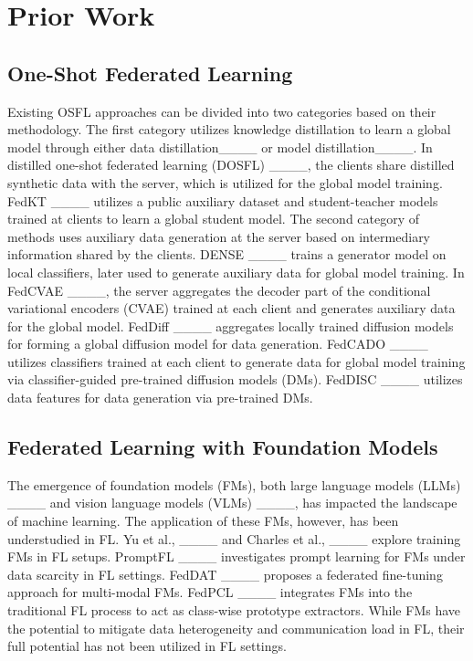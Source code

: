 \section{Prior Work}
\subsection{One-Shot Federated Learning}
Existing OSFL approaches can be divided into two categories based on their methodology. The first category utilizes knowledge distillation to learn a global model through either data distillation____ or model distillation____. In distilled one-shot federated learning (DOSFL) ____, the clients share distilled synthetic data with the server, which is utilized for the global model training. FedKT ____ utilizes a public auxiliary dataset and student-teacher models trained at clients to learn a global student model. The second category of methods uses auxiliary data generation at the server based on intermediary information shared by the clients. DENSE ____ trains a generator model on local classifiers, later used to generate auxiliary data for global model training. In FedCVAE ____, the server aggregates the decoder part of the conditional variational encoders (CVAE) trained at each client and generates auxiliary data for the global model. FedDiff ____ aggregates locally trained diffusion models for forming a global diffusion model for data generation. FedCADO ____ utilizes classifiers trained at each client to generate data for global model training via classifier-guided pre-trained diffusion models (DMs). FedDISC ____ utilizes data features for data generation via pre-trained DMs. 

\subsection{Federated Learning with Foundation Models}

The emergence of foundation models (FMs), both large language models (LLMs) ____ and vision language models (VLMs) ____, has impacted the landscape of machine learning. The application of these FMs, however, has been understudied in FL. Yu et al., ____ and Charles et al., ____ explore training FMs in FL setups. PromptFL ____ investigates prompt learning for FMs under data scarcity in FL settings. FedDAT ____ proposes a federated fine-tuning approach for multi-modal FMs. FedPCL ____ integrates FMs into the traditional FL process to act as class-wise prototype extractors. While FMs have the potential to mitigate data heterogeneity and communication load in FL, their full potential has not been utilized in FL settings.